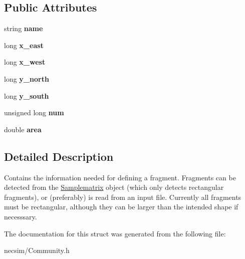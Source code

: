 \subsection*{Public Attributes}
\begin{DoxyCompactItemize}
\item 
string {\bfseries name}\hypertarget{struct_fragment_acf92da0ecedecb7080adf56e35543636}{}\label{struct_fragment_acf92da0ecedecb7080adf56e35543636}

\item 
long {\bfseries x\+\_\+east}\hypertarget{struct_fragment_a0257d6b1942656e4181eab82cc5392c4}{}\label{struct_fragment_a0257d6b1942656e4181eab82cc5392c4}

\item 
long {\bfseries x\+\_\+west}\hypertarget{struct_fragment_aabfd09652d5abae4b6393fd40e6d3d9d}{}\label{struct_fragment_aabfd09652d5abae4b6393fd40e6d3d9d}

\item 
long {\bfseries y\+\_\+north}\hypertarget{struct_fragment_a1d792c8e975cbc9405ece3a90a283c4f}{}\label{struct_fragment_a1d792c8e975cbc9405ece3a90a283c4f}

\item 
long {\bfseries y\+\_\+south}\hypertarget{struct_fragment_a71d7c613d71459b72158ef80ba705bfc}{}\label{struct_fragment_a71d7c613d71459b72158ef80ba705bfc}

\item 
unsigned long {\bfseries num}\hypertarget{struct_fragment_ac966a3ac928cba2706ca9c87f159d1ee}{}\label{struct_fragment_ac966a3ac928cba2706ca9c87f159d1ee}

\item 
double {\bfseries area}\hypertarget{struct_fragment_ad37e6d449d9b0b1273e712e5a4da2887}{}\label{struct_fragment_ad37e6d449d9b0b1273e712e5a4da2887}

\end{DoxyCompactItemize}


\subsection{Detailed Description}
Contains the information needed for defining a fragment. Fragments can be detected from the \hyperlink{class_samplematrix}{Samplematrix} object (which only detects rectangular fragments), or (preferably) is read from an input file. Currently all fragments must be rectangular, although they can be larger than the intended shape if necesssary. 

The documentation for this struct was generated from the following file\+:\begin{DoxyCompactItemize}
\item 
necsim/Community.\+h\end{DoxyCompactItemize}
